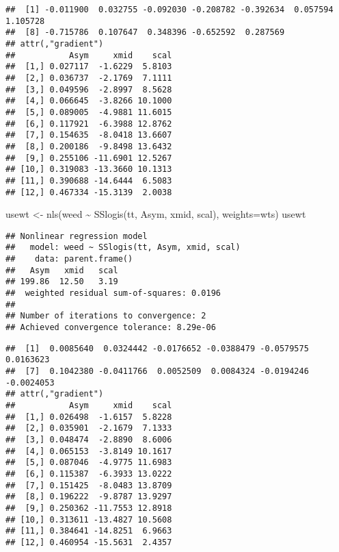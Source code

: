 \documentclass[
]{article}
\newenvironment{Shaded}{\begin{snugshade}}{\end{snugshade}}
\newcommand{\AttributeTok}[1]{\textcolor[rgb]{0.77,0.63,0.00}{#1}}
\newcommand{\CommentTok}[1]{\textcolor[rgb]{0.56,0.35,0.01}{\textit{#1}}}
\newcommand{\FunctionTok}[1]{\textcolor[rgb]{0.00,0.00,0.00}{#1}}
\newcommand{\NormalTok}[1]{#1}
\newcommand{\OtherTok}[1]{\textcolor[rgb]{0.56,0.35,0.01}{#1}}
\newcommand{\SpecialCharTok}[1]{\textcolor[rgb]{0.00,0.00,0.00}{#1}}
\begin{document}
\begin{Shaded}
\end{Shaded}

\begin{verbatim}
##  [1] -0.011900  0.032755 -0.092030 -0.208782 -0.392634  0.057594  1.105728
##  [8] -0.715786  0.107647  0.348396 -0.652592  0.287569
## attr(,"gradient")
##           Asym     xmid    scal
##  [1,] 0.027117  -1.6229  5.8103
##  [2,] 0.036737  -2.1769  7.1111
##  [3,] 0.049596  -2.8997  8.5628
##  [4,] 0.066645  -3.8266 10.1000
##  [5,] 0.089005  -4.9881 11.6015
##  [6,] 0.117921  -6.3988 12.8762
##  [7,] 0.154635  -8.0418 13.6607
##  [8,] 0.200186  -9.8498 13.6432
##  [9,] 0.255106 -11.6901 12.5267
## [10,] 0.319083 -13.3660 10.1313
## [11,] 0.390688 -14.6444  6.5083
## [12,] 0.467334 -15.3139  2.0038
\end{verbatim}

\begin{Shaded}
\begin{Highlighting}[]
\NormalTok{usewt }\OtherTok{\textless{}{-}} \FunctionTok{nls}\NormalTok{(weed }\SpecialCharTok{\textasciitilde{}} \FunctionTok{SSlogis}\NormalTok{(tt, Asym, xmid, scal), }\AttributeTok{weights=}\NormalTok{wts)}
\NormalTok{usewt}
\end{Highlighting}
\end{Shaded}

\begin{verbatim}
## Nonlinear regression model
##   model: weed ~ SSlogis(tt, Asym, xmid, scal)
##    data: parent.frame()
##   Asym   xmid   scal 
## 199.86  12.50   3.19 
##  weighted residual sum-of-squares: 0.0196
## 
## Number of iterations to convergence: 2 
## Achieved convergence tolerance: 8.29e-06
\end{verbatim}

\begin{Shaded}
\end{Shaded}

\begin{verbatim}
##  [1]  0.0085640  0.0324442 -0.0176652 -0.0388479 -0.0579575  0.0163623
##  [7]  0.1042380 -0.0411766  0.0052509  0.0084324 -0.0194246 -0.0024053
## attr(,"gradient")
##           Asym     xmid    scal
##  [1,] 0.026498  -1.6157  5.8228
##  [2,] 0.035901  -2.1679  7.1333
##  [3,] 0.048474  -2.8890  8.6006
##  [4,] 0.065153  -3.8149 10.1617
##  [5,] 0.087046  -4.9775 11.6983
##  [6,] 0.115387  -6.3933 13.0222
##  [7,] 0.151425  -8.0483 13.8709
##  [8,] 0.196222  -9.8787 13.9297
##  [9,] 0.250362 -11.7553 12.8918
## [10,] 0.313611 -13.4827 10.5608
## [11,] 0.384641 -14.8251  6.9663
## [12,] 0.460954 -15.5631  2.4357
\end{verbatim}
\end{document}
